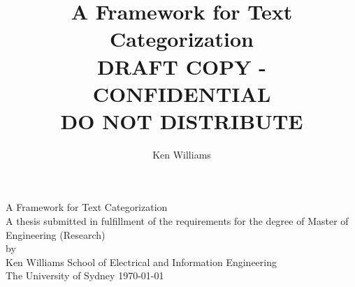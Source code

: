 \documentclass[a4paper,oneside]{book}
\title{A Framework for Text Categorization \\
DRAFT COPY - CONFIDENTIAL \\
DO NOT DISTRIBUTE}
\author{Ken Williams}
\begin{document}
\frontmatter

\begin{titlepage}
\begin{center}
      \mbox{}
      \vspace{1in}
      \vfill
      {\huge A Framework for Text Categorization}\\
      \vfill
      \vfill
      A thesis submitted in fulfillment of the requirements for the degree of
      \vfill
      {\Large Master of Engineering (Research)}\\[6pt]
      by\\[6pt]
      {\Large Ken Williams}
      \vfill
      \vfill
      School of Electrical and Information Engineering\\
      The University of Sydney
      \vfill
      \today
      \vspace*{1.5in}
\end{center}
\end{titlepage}




\tableofcontents
\listoffigures
\listoftables

\mainmatter







\backmatter


\end{document}

